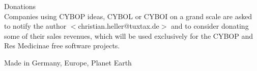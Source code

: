 \small{Donations\\
    Companies using CYBOP ideas, CYBOL or CYBOI on a grand scale are asked to
    notify the author \(<\)christian.heller@tuxtax.de\(>\) and to consider
    donating some of their sales revenues, which will be used exclusively for
    the CYBOP and Res Medicinae free software projects.}


\small{Made in Germany, Europe, Planet Earth}
